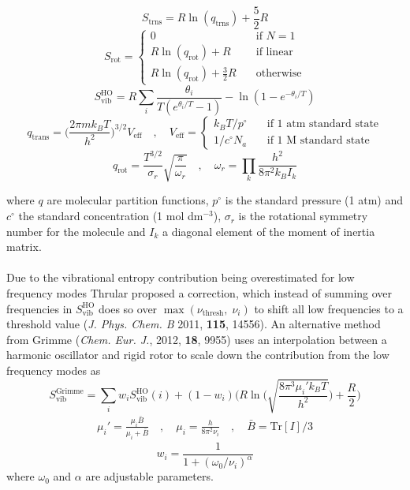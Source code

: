 \documentclass[10pt]{article}
\begin{document}
\begin{equation}
	S_\text{trns} = R  \ln(q_\text{trns}) + \frac{5}{2}R
\end{equation}
\begin{equation}
	S_\text{rot} = \begin{cases}
		0 &\quad \text{if  } N = 1 \\
		R  \ln(q_\text{rot}) + R &\quad \text{if linear} \\
		R  \ln(q_\text{rot}) + \frac{3}{2}R &\quad \text{otherwise}
	\end{cases}
\end{equation}
\begin{equation}
	S_\text{vib}^\text{HO} = R \sum_i \frac{\theta_i}{T(e^{\theta_i / T} - 1)} - \ln(1 - e^{-\theta_i / T})
\end{equation}
\begin{equation}
	q_\text{trans} = {\Big (} \frac{2\pi m k_B T}{h^2} {\Big )}^{3/2}  V_\text{eff} \quad , \quad V_\text{eff} =  \begin{cases}
		k_B T / p^{\circ} \quad&\text{if 1 atm standard state} \\
		1 / c^\circ N_a \quad&\text{if 1 M standard state}
	\end{cases}
\end{equation}
\begin{equation}
	q_\text{rot} = \frac{T^{3/2}}{\sigma_r} \sqrt{\frac{\pi}{\omega_r}} \quad,\quad \omega_r = \prod_{k} \frac{h^2}{8 \pi^2 k_B I_k}
\end{equation}

where $q$ are molecular partition functions, $p^{\circ}$ is the standard pressure (1 atm) and $c^\circ$ the standard concentration (1 mol dm$^{-3}$), $\sigma_r$ is the rotational symmetry number for the molecule and $I_k$ a diagonal element of the moment of inertia matrix.
\\\\
Due to the vibrational entropy contribution being overestimated for low frequency modes Thrular proposed a correction, which instead of summing over frequencies in $S_\text{vib}^\text{HO}$ does so over $\max(\nu_\text{thresh},\; \nu_i)$ to shift all low frequencies to a threshold value (\emph{J. Phys. Chem. B} 2011, {\bfseries{115}}, 14556). An alternative method from Grimme (\emph{Chem. Eur. J.}, 2012, {\bfseries{18}}, 9955) uses an interpolation between a harmonic oscillator and rigid rotor to scale down the contribution from the low frequency modes as
\begin{equation}
	S_\text{vib}^\text{Grimme} = \sum_i w_i S_ \text{vib}^\text{HO}(i) + (1-w_i) {\Big (} R\ln {\Big (} \sqrt{\frac{8 \pi^3 \mu_i' k_B T}{h^2}} {\Big )} + \frac{R}{2} {\Big )}
\end{equation}
\begin{eqnarray}
	\mu_i' = \frac{\mu_i \bar{B}}{\mu_i + \bar{B}} \quad,\quad \mu_i = \frac{h}{8\pi^2 \nu_i} \quad,\quad \bar{B} = \text{Tr}[I] / 3
\end{eqnarray}
\begin{equation}
	w_i = \frac{1}{1 + (\omega_0/ \nu_i)^\alpha}
\end{equation}
where $\omega_0$ and $\alpha$ are adjustable parameters.
\end{document}
